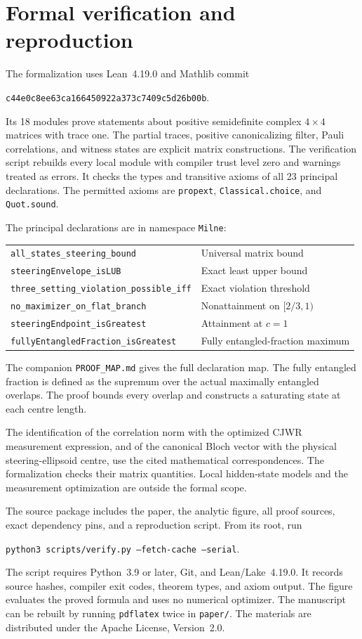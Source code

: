 \documentclass[11pt]{article}
\begin{document}
\section{Formal verification and reproduction}
The formalization uses Lean~4.19.0 and Mathlib commit
\begin{center}\small\texttt{c44e0c8ee63ca166450922a373c7409c5d26b00b}.\end{center}
Its 18 modules prove statements about positive semidefinite complex $4\times4$ matrices with trace one. The partial traces, positive canonicalizing filter, Pauli correlations, and witness states are explicit matrix constructions. The verification script rebuilds every local module with compiler trust level zero and warnings treated as errors. It checks the types and transitive axioms of all 23 principal declarations. The permitted axioms are \texttt{propext}, \texttt{Classical.choice}, and \texttt{Quot.sound}.

The principal declarations are in namespace \texttt{Milne}:
\begin{center}\small
\begin{tabular}{@{}ll@{}}
\texttt{all\_states\_steering\_bound} & Universal matrix bound\\
\texttt{steeringEnvelope\_isLUB} & Exact least upper bound\\
\texttt{three\_setting\_violation\_possible\_iff} & Exact violation threshold\\
\texttt{no\_maximizer\_on\_flat\_branch} & Nonattainment on $[2/3,1)$\\
\texttt{steeringEndpoint\_isGreatest} & Attainment at $c=1$\\
\texttt{fullyEntangledFraction\_isGreatest} & Fully entangled-fraction maximum
\end{tabular}
\end{center}
The companion \texttt{PROOF\_MAP.md} gives the full declaration map. The fully entangled fraction is defined as the supremum over the actual maximally entangled overlaps. The proof bounds every overlap and constructs a saturating state at each centre length.

The identification of the correlation norm with the optimized CJWR measurement expression, and of the canonical Bloch vector with the physical steering-ellipsoid centre, use the cited mathematical correspondences. The formalization checks their matrix quantities. Local hidden-state models and the measurement optimization are outside the formal scope.

The source package includes the paper, the analytic figure, all proof sources, exact dependency pins, and a reproduction script. From its root, run
\begin{center}\small\texttt{python3 scripts/verify.py --fetch-cache --serial}.\end{center}
The script requires Python~3.9 or later, Git, and Lean/Lake~4.19.0. It records source hashes, compiler exit codes, theorem types, and axiom output. The figure evaluates the proved formula and uses no numerical optimizer. The manuscript can be rebuilt by running \texttt{pdflatex} twice in \texttt{paper/}. The materials are distributed under the Apache License, Version~2.0.
\end{document}
